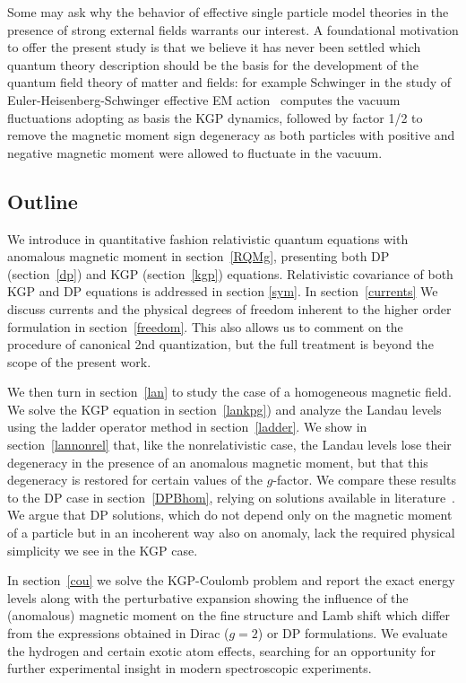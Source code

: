 \documentclass[epj]{svjour}
\begin{document}
Some may ask why the behavior of effective single particle model theories in the presence of strong external fields warrants our interest. A foundational motivation to offer the present study is that we believe it has never been settled which quantum theory description should be the basis for the development of the quantum field theory of matter and fields: for example Schwinger in the study of Euler-Heisenberg-Schwinger effective EM action~\cite{Schwinger:1951nm} computes the vacuum fluctuations adopting as basis the KGP dynamics, followed by factor 1/2 to remove the magnetic moment sign degeneracy as both particles with positive and negative magnetic moment were allowed to fluctuate in the vacuum.

\subsection{Outline} \label{outline}
We introduce in quantitative fashion relativistic quantum equations with anomalous magnetic moment in section~\ref{RQMg}, presenting both DP (section~\ref{dp}) and KGP (section~\ref{kgp}) equations. Relativistic covariance of both KGP and DP equations is addressed in section \ref{sym}. In section~\ref{currents} We discuss currents and the physical degrees of freedom inherent to the higher order formulation in section~\ref{freedom}. This also allows us to comment on the procedure of canonical 2nd quantization, but the full treatment is beyond the scope of the present work.

We then turn in section~\ref{lan} to study the case of a homogeneous magnetic field. We solve the KGP equation in section~\ref{lankpg}) and analyze the Landau levels using the ladder operator method in section~\ref{ladder}. We show in section~\ref{lannonrel} that, like the nonrelativistic case, the Landau levels lose their degeneracy in the presence of an anomalous magnetic moment, but that this degeneracy is restored for certain values of the $g$-factor. We compare these results to the DP case in section~\ref{DPBhom}, relying on solutions available in literature~\cite{Tsai:1972iq}. We argue that DP solutions, which do not depend only on the magnetic moment of a particle but in an incoherent way also on anomaly, lack the required physical simplicity we see in the KGP case.

In section~\ref{cou} we solve the KGP-Coulomb problem and report the exact energy levels along with the perturbative expansion showing the influence of the (anomalous) magnetic moment on the fine structure and Lamb shift which differ from the expressions obtained in Dirac ($g=2$) or DP formulations. We evaluate the hydrogen and certain exotic atom effects, searching for an opportunity for further experimental insight in modern spectroscopic experiments.
\end{document}
